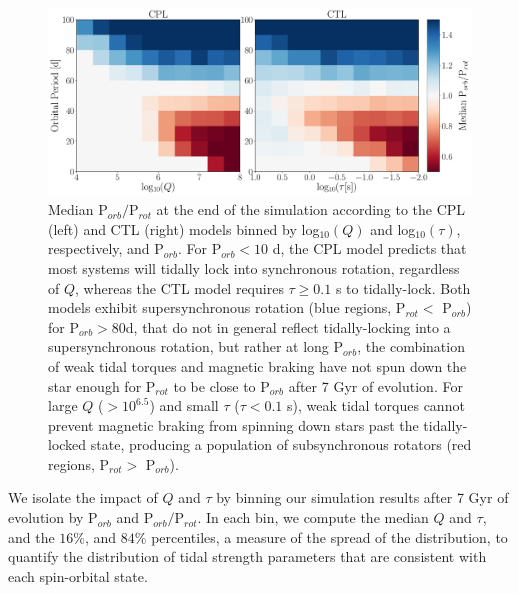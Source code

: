 \documentclass[twocolumn]{aastex61}
\begin{document}
\begin{figure}[ht]
	\includegraphics[width=\textwidth]{../Plots/qTauPorbRatioHist.pdf}
   \caption{Median P$_{orb}/$P$_{rot}$ at the end of the simulation according to the CPL (left) and CTL (right) models binned by log$_{10}(Q)$ and log$_{10}(\tau)$, respectively, and P$_{orb}$.  For P$_{orb} < 10$ d, the CPL model predicts that most systems will tidally lock into synchronous rotation, regardless of $Q$, whereas the CTL model requires $\tau \geq 0.1$ s to tidally-lock.  Both models exhibit supersynchronous rotation (blue regions, P$_{rot} <$ P$_{orb}$) for P$_{orb} > 80$d, that do not in general reflect tidally-locking into a supersynchronous rotation, but rather at long P$_{orb}$, the combination of weak tidal torques and magnetic braking have not spun down the star enough for P$_{rot}$ to be close to P$_{orb}$ after 7 Gyr of evolution. For large $Q$ ($> 10^{6.5}$) and small $\tau$ ($\tau < 0.1$ s), weak tidal torques cannot prevent magnetic braking from spinning down stars past the tidally-locked state, producing a population of subsynchronous rotators (red regions, P$_{rot} >$ P$_{orb}$).}%
    \label{fig:qTauLock}%
\end{figure}


We isolate the impact of $Q$ and $\tau$ by binning our simulation results after 7 Gyr of evolution by P$_{orb}$ and P$_{orb}/$P$_{rot}$.  In each bin, we compute the median $Q$ and $\tau$, and the $16\%$, and $84\%$ percentiles, a measure of the spread of the distribution, to quantify the distribution of tidal strength parameters that are consistent with each spin-orbital state.  
\end{document}
